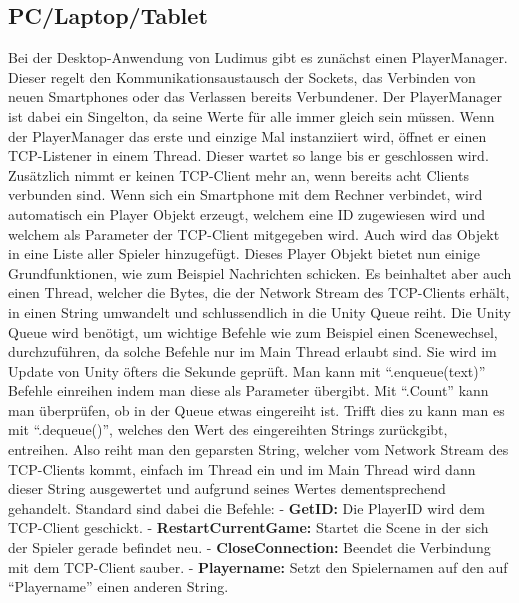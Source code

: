 \subsection{PC/Laptop/Tablet}
Bei der Desktop-Anwendung von Ludimus gibt es zunächst einen PlayerManager. Dieser regelt den Kommunikationsaustausch der Sockets, das Verbinden von neuen Smartphones oder das Verlassen bereits Verbundener. Der PlayerManager ist dabei ein Singelton, da seine Werte für alle immer gleich sein müssen. Wenn der PlayerManager das erste und einzige Mal instanziiert wird, öffnet er einen TCP-Listener in einem Thread. Dieser wartet so lange bis er geschlossen wird. Zusätzlich nimmt er keinen TCP-Client mehr an, wenn bereits acht Clients verbunden sind. Wenn sich ein Smartphone mit dem Rechner verbindet, wird automatisch ein Player Objekt erzeugt, welchem eine ID zugewiesen wird und welchem als Parameter der TCP-Client mitgegeben wird. Auch wird das Objekt in eine Liste aller Spieler hinzugefügt. Dieses Player Objekt bietet nun einige Grundfunktionen, wie zum Beispiel Nachrichten schicken. Es beinhaltet aber auch einen Thread, welcher die Bytes, die der Network Stream des TCP-Clients erhält, in einen String umwandelt und schlussendlich in die Unity Queue reiht. Die Unity Queue wird benötigt, um wichtige Befehle wie zum Beispiel einen Scenewechsel, durchzuführen, da solche Befehle nur im Main Thread erlaubt sind. Sie wird im Update von Unity öfters die Sekunde geprüft. Man kann mit “.enqueue(text)” Befehle einreihen indem man diese als Parameter übergibt. Mit “.Count” kann man überprüfen, ob in der Queue etwas eingereiht ist. Trifft dies zu kann man es mit “.dequeue()”, welches den Wert des eingereihten Strings zurückgibt, entreihen. Also reiht man den geparsten String, welcher vom Network Stream des TCP-Clients kommt, einfach im Thread ein und im Main Thread wird dann dieser String ausgewertet und aufgrund seines Wertes dementsprechend gehandelt. Standard sind dabei die Befehle:
\newline \tab 
- \textbf{GetID:} Die PlayerID wird dem TCP-Client geschickt.
\newline \tab  
- \textbf{RestartCurrentGame:} Startet die Scene in der sich der Spieler gerade befindet \tab neu.
\newline \tab 
- \textbf{CloseConnection:} Beendet die Verbindung mit dem TCP-Client sauber.
\newline \tab 
- \textbf{Playername:} Setzt den Spielernamen auf den auf “Playername” einen anderen \tab String.

